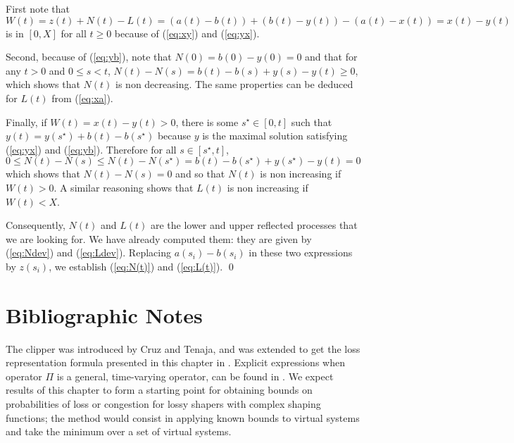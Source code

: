 First note that
\[ W(t) = z(t) + N(t) - L(t) = (a(t) - b(t)) + (b(t) - y(t)) - (a(t)
- x(t)) = x(t) - y(t) \]
is in $[0,X]$ for all $t \geq 0$ because of (\ref{eq:xy}) and
(\ref{eq:yx}).

Second, because of (\ref{eq:yb}), note that $N(0) = b(0) - y(0) = 0$
and that for any $t > 0$
and $0 \leq s < t$, $N(t) - N(s) = b(t) -b(s) +y(s) - y(t) \geq 0$,
which shows that $N(t)$ is
non decreasing. The same properties can be deduced for $L(t)$ from
(\ref{eq:xa}).

Finally, if $W(t) = x(t) - y(t) > 0$, there is some $s^\star \in
[0,t]$ such that $y(t) = y(s^\star) + b(t) - b(s^\star)$ because
$y$ is the maximal solution satisfying (\ref{eq:yx}) and
(\ref{eq:yb}). Therefore for all $s \in [s^\star ,t]$,
\[ 0 \leq N(t) - N(s) \leq N(t) - N(s^\star) = b(t) - b(s^\star) +
y(s^\star) - y(t) = 0 \]
which shows that $N(t) - N(s) = 0$ and so that $N(t)$ is non
increasing if $W(t) > 0$.
A similar reasoning shows that $L(t)$ is non increasing if $W(t) < X$.

Consequently, $N(t)$ and $L(t)$ are the lower and upper reflected
processes that we are looking for. We have already computed them:
they are given by (\ref{eq:Ndev}) and  (\ref{eq:Ldev}).
Replacing $a(s_i) - b(s_i)$ in these two expressions by $z(s_i)$,
we establish (\ref{eq:N(t)}) and (\ref{eq:L(t)}).
\qed


\section{Bibliographic Notes}

The clipper was introduced by Cruz and Tenaja, and was extended to
get the loss representation formula presented in this chapter in
\cite{CCLBT,TimeSpac}. Explicit expressions when operator $\Pi$ is
a general, time-varying operator, can be found in \cite{CCLBT}. We
expect results of this chapter to form a starting point for
obtaining bounds on probabilities of loss or congestion for lossy
shapers with complex shaping functions; the method would consist
in applying known bounds to virtual systems and take the minimum
over a set of virtual systems.
